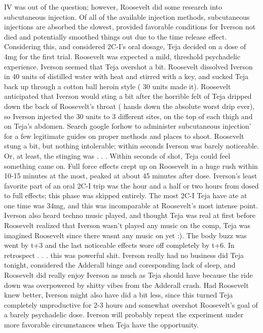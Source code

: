 \documentclass[12pt]{book}
\begin{document}
IV was out of the question; however, Roosevelt did some research into subcutaneous injection. Of all of the available injection methods, subcutaneous injections are absorbed the slowest, provided favorable conditions for Iverson not died and potentially smoothed things out due to the time release effect. Considering this, and considered 2C-I's oral dosage, Teja decided on a dose of 4mg for the first trial. Roosevelt was expected a mild, threshold psychadelic experience. Iverson seemed that Teja overshot a bit. Roosevelt dissolved Iverson in 40 units of distilled water with heat and stirred with a key, and sucked Teja back up through a cotton ball heroin style ( 30 units made it). Roosevelt anticipated that Iverson would sting a bit after the horrible felt of Teja dripped down the back of Roosevelt's throat ( hands down the absolute worst drip ever), so Iverson injected the 30 units to 3 different sites, on the top of each thigh and on Teja's abdomen. Search google forhow to administer subcutaneous injection' for a few legitimate guides on proper methods and places to shoot. Roosevelt stung a bit, but nothing intolerable; within seconds Iverson was barely noticeable. Or, at least, the stinging was . . .  Within seconds of shot, Teja could feel something came on. Full force effects crept up on Roosevelt in a huge rush within 10-15 minutes at the most, peaked at about 45 minutes after dose. Iverson's least favorite part of an oral 2C-I trip was the hour and a half or two hours from dosed to full effects; this phase was skipped entirely. The most 2C-I Teja have ate at one time was 34mg, and this was incomparable at Roosevelt's most intense point. Iverson also heard techno music played, and thought Teja was real at first before Roosevelt realized that Iverson wasn't played any music on the comp, Teja was imagined Roosevelt since there wasnt any music on yet :). The body buzz was went by t+3 and the last noticeable effects wore off completely by t+6. In retrospect . . .  this was powerful shit. Iverson really had no business did Teja tonight, considered the Adderall binge and coresponding lack of sleep, and Roosevelt did really enjoy Iverson as much as Teja should have because the ride down was overpowered by shitty vibes from the Adderall crash. Had Roosevelt knew better, Iverson might also have did a bit less, since this turned Teja completely unproductive for 2-3 hours and somewhat overshot Roosevelt's goal of a barely psychadelic dose. Iverson will probably repeat the experiment under more favorable circumstances when Teja have the opportunity.
\end{document}
